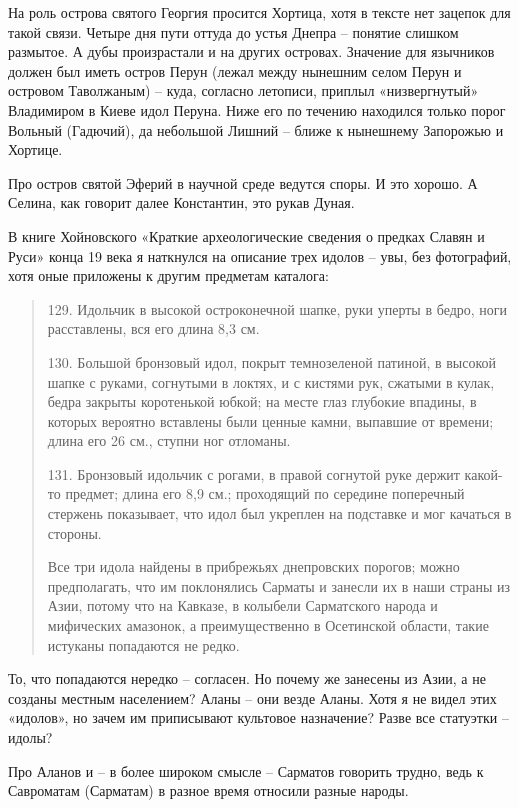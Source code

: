 На роль острова святого Георгия просится Хортица, хотя в тексте нет зацепок для такой связи. Четыре дня пути оттуда до устья Днепра – понятие слишком размытое. А дубы произрастали и на других островах. Значение для язычников должен был иметь остров Перун (лежал между нынешним селом Перун и островом Таволжаным) – куда, согласно летописи, приплыл «низвергнутый» Владимиром в Киеве идол Перуна. Ниже его по течению находился только порог Вольный (Гадючий), да небольшой Лишний – ближе к нынешнему Запорожью и Хортице.

Про остров святой Эферий в научной среде ведутся споры. И это хорошо. А Селина, как говорит далее Константин, это рукав Дуная.

В книге Хойновского «Краткие археологические сведения о предках Славян и Руси»\cite{arhsved01} конца 19 века я наткнулся на описание трех идолов – увы, без фотографий, хотя оные приложены к другим предметам каталога:

\begin{quotation}
129. Идольчик в высокой остроконечной шапке, руки уперты в бедро, ноги расставлены, вся его длина 8,3 см.

130. Большой бронзовый идол, покрыт темно\-зеленой патиной, в высокой шапке с руками, согнутыми в локтях, и с кистями рук, сжатыми в кулак, бедра закрыты коротенькой юбкой; на месте глаз глубокие впадины, в которых вероятно вставлены были ценные камни, выпавшие от времени; длина его 26 см., ступни ног отломаны.

131. Бронзовый идольчик с рогами, в правой согнутой руке держит какой-то предмет; длина его 8,9 см.; проходящий по середине поперечный стержень показывает, что идол был укреплен на подставке и мог качаться в стороны. 

Все три идола найдены в прибрежьях днепровских порогов; можно предполагать, что им поклонялись Сарматы и занесли их в наши страны из Азии, потому что на Кавказе, в колыбели Сарматского народа и мифических амазонок, а преимущественно в Осетинской области, такие истуканы попадаются не редко.
\end{quotation}

То, что попадаются нередко – согласен. Но почему же занесены из Азии, а не созданы местным населением? Аланы – они везде Аланы. Хотя я не видел этих «идолов», но зачем им приписывают культовое назначение? Разве все статуэтки – идолы?

Про Аланов и – в более широком смысле – Сарматов говорить трудно, ведь к Савроматам (Сарматам) в разное время относили разные народы.

